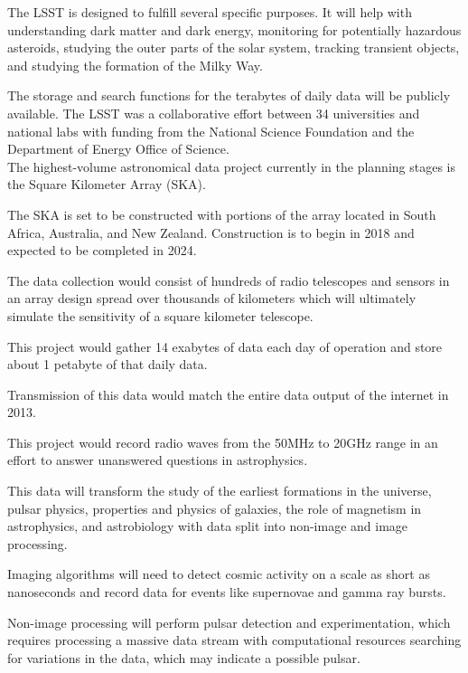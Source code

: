 \documentclass[sigconf]{acmart}
\begin{document}
The LSST is designed to fulfill several specific purposes. It will help with understanding dark matter and dark energy, monitoring for potentially hazardous asteroids, studying the outer parts of the solar system, tracking transient objects, and studying the formation of the Milky Way\cite{LSSTRank}. 

The storage and search functions for the terabytes of daily data will be publicly available. The LSST was a collaborative effort between 34 universities and national labs with funding from the National Science Foundation and the Department of Energy Office of Science\cite{EPO}. \\ 


The highest-volume astronomical data project currently in the planning stages is the Square Kilometer Array (SKA)\cite{IBM2012}. 

The SKA is set to be constructed with portions of the array located in South Africa, Australia, and New Zealand. Construction is to begin in 2018 and expected to be completed in 2024. 

The data collection would consist of hundreds of radio telescopes and sensors in an array design spread over thousands of kilometers which will ultimately simulate the sensitivity of a square kilometer telescope. 

This project would gather 14 exabytes of data each day of operation and store about 1 petabyte of that daily data\cite{Economist2010}. 

Transmission of this data would match the entire data output of the internet in 2013\cite{Andersen2012}. 

This project would record radio waves from the 50MHz to 20GHz range in an effort to answer unanswered questions in astrophysics\cite{Project2017}. 

This data will transform the study of the earliest formations in the universe, pulsar physics, properties and physics of galaxies, the role of magnetism in astrophysics, and astrobiology with data split into non-image and image processing. 

Imaging algorithms will need to detect cosmic activity on a scale as short as nanoseconds and record data for events like supernovae and gamma ray bursts. 

Non-image processing will perform pulsar detection and experimentation, which requires processing a massive data stream with computational resources searching for variations in the data, which may indicate a possible pulsar\cite{Project2017}. 
\end{document}
